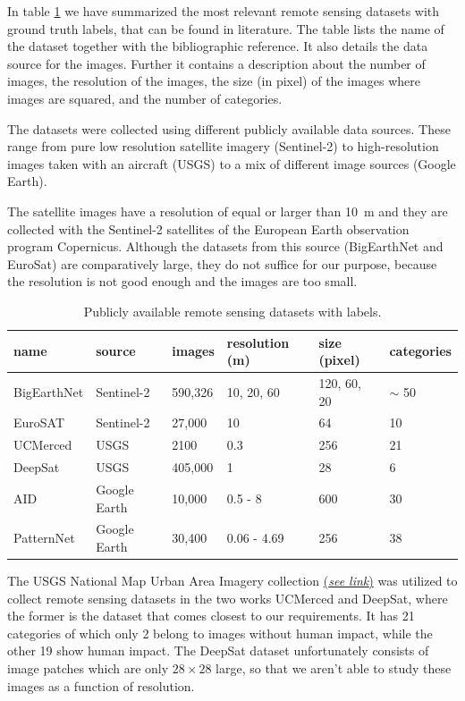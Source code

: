 In table \ref{table:datasets} we have summarized the most relevant remote sensing datasets with ground truth labels, that can be found in literature. The table  lists the name of the dataset together with the bibliographic reference. It also details the data source for the images. Further it contains a description about the number of images, the resolution of the images, the size (in pixel) of the images where images are squared, and the number of categories.

The datasets were collected using different publicly available data sources. These range from pure low resolution satellite imagery (Sentinel-2) to high-resolution images taken with an aircraft (USGS) to a mix of different image sources (Google Earth). 

The satellite images have a resolution of equal or larger than 10~m and they are collected with the Sentinel-2 satellites of the European Earth observation program Copernicus. Although the datasets from this source (BigEarthNet and EuroSat) are comparatively large, they do not suffice for our purpose, because the resolution is not good enough and the images are too small.

\begin{table}[h!]
	\begin{tabular}{l | l | l | l | l | l }
	name & source & images & resolution (m) & size (pixel) & categories \\
	\hline
	BigEarthNet \parencite{sumbul2019} & Sentinel-2 & 590,326 & 10, 20, 60 & 120, 60, 20 & $\sim$ 50 \\
	EuroSAT \parencite{helber2017}	& Sentinel-2 & 27,000  & 10 & 64  & 10 \\
	UCMerced \parencite{yang2010} & USGS & 2100 & 0.3 & 256 & 21 \\
	DeepSat \parencite{basu2015}  & USGS  & 405,000 & 1 & 28 & 6  \\
	AID \parencite{xia2016} & Google Earth & 10,000  & 0.5 - 8  & 600 & 30 \\
	PatternNet \parencite{zhou2017} & Google Earth & 30,400 & 0.06 - 4.69 & 256 & 38 \\
	\end{tabular}
	\caption{Publicly available remote sensing datasets with labels.}
	\label{table:datasets}	
\end{table}

The USGS National Map Urban Area Imagery collection \href{https://earthexplorer.usgs.gov/}{(\textit{see link})} was utilized to collect remote sensing datasets in the two works UCMerced and DeepSat, where the former is the dataset that comes closest to our requirements. It has 21 categories of which only 2 belong to images without human impact, while the other 19 show human impact. The DeepSat dataset unfortunately consists of image patches which are only $28 \times 28$ large, so that we aren't able to study these images as a function of resolution.

